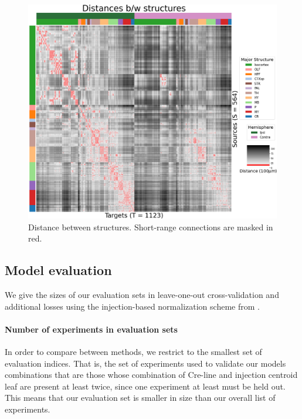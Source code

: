 \begin{figure}[H]
    \centering
    \includegraphics[width = 7in]{figs/distances_leafs.png} 
    \caption{Distance between structures.  Short-range connections are masked in red.}
    \label{fig:dist_bw_str}
\end{figure}

\newpage

\subsection{Model evaluation}
\label{supp_sec:model-evaluation}

We give the sizes of our evaluation sets in leave-one-out cross-validation and additional losses using the injection-based normalization scheme from \citet{Knox2019-ot}.

\paragraph{Number of experiments in evaluation sets}

In order to compare between methods, we restrict to the smallest set of evaluation indices.
That is, the set of experiments used to validate our models combinations that are those whose combination of Cre-line and injection centroid leaf are present at least twice, since one experiment at least must be held out.
This means that our evaluation set is smaller in size than our overall list of experiments.


